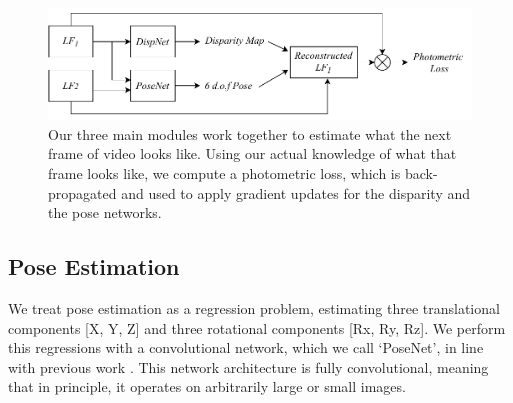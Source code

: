 \begin{figure}
    \includegraphics[width=\textwidth]{images/archs/unifiedpipeline.pdf}
    \caption[An architecture for unsupervised learning of depth and pose from light fields]{Our three main modules work together to estimate what the next frame of video looks like. Using our actual knowledge of what that frame looks like, we compute a photometric loss, which is back-propagated and used to apply gradient updates for the disparity and the pose networks.}
\end{figure}

\subsection{Pose Estimation}

We treat pose estimation as a regression problem, estimating three translational components [X, Y, Z] and three rotational components [Rx, Ry, Rz]. We perform this regressions with a convolutional network, which we call `PoseNet', in line with previous work \cite{zhan2018deepfeature,bian2019consistency,zhou2017unsupervised}. This network architecture is fully convolutional, meaning that in principle, it operates on arbitrarily large or small images. 

